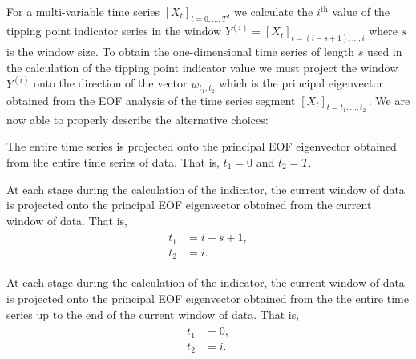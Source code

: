For a multi-variable time series $[X_t]_{t=0,...,T}$, we calculate the $i^\textrm{th}$ value of the tipping point indicator series in the window $Y^{(i)} = [X_t]_{t=(i-s+1),...,i}$ where $s$ is the window size. To obtain the one-dimensional time series of length $s$ used in the calculation of the tipping point indicator value we must project the window $Y^{(i)}$ onto the direction of the vector $w_{t_1,t_2}$ which is the principal eigenvector obtained from the EOF analysis of the time series segment $[X_t]_{t=t_1,...,t_2}$\,. We are now able to properly describe the alternative choices:

\begin{definition}
	\label{def:2D:EOF:globalprojection}
	The entire time series is projected onto the principal EOF eigenvector obtained from the entire time series of data. That is, $t_1 = 0$ and $t_2 = T$. 
\end{definition}

\begin{definition}
	\label{def:2D:EOF:windowprojection}
	At each stage during the calculation of the indicator, the current window of data is projected onto the principal EOF eigenvector obtained from the current window of data. That is, 
	\begin{align}
	\begin{split}
	t_1& = i-s+1,\\
	t_2 &= i.
	\end{split}
	\end{align}
\end{definition}

\begin{definition}
	\label{def:2D:EOF:movingprojection}
	At each stage during the calculation of the indicator, the current window of data is projected onto the principal EOF eigenvector obtained from the the entire time series up to the end of the current window of data. That is, 
	\begin{align}
	\begin{split}
	t_1& = 0,\\
	t_2 &= i.
	\end{split}
	\end{align}
\end{definition}

{}

